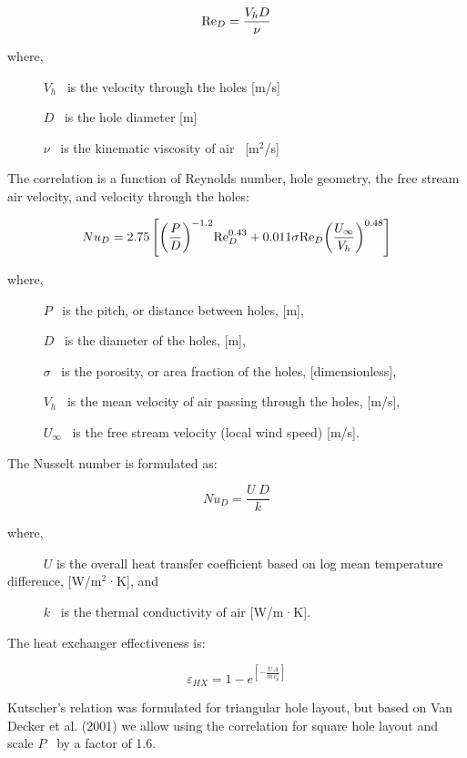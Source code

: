 \begin{equation}
{{\mathop{\rm Re}\nolimits}_D} = \frac{{{V_h}D}}{\nu }
\end{equation}

where,

~~~~~ \({V_h}\) ~is the velocity through the holes {[}m/s{]}

~~~~~ \(D\) ~is the hole diameter {[}m{]}

~~~~~ \(\nu\) ~is the kinematic viscosity of air~ {[}m\(^{2}\)/s{]}

The correlation is a function of Reynolds number, hole geometry, the free stream air velocity, and velocity through the holes:

\begin{equation}
N{u_D} = 2.75\left[ {{{\left( {\frac{P}{D}} \right)}^{ - 1.2}}{\mathop{\rm Re}\nolimits}_D^{0.43} + 0.011\sigma {{{\mathop{\rm Re}\nolimits} }_D}{{\left( {\frac{{{U_\infty }}}{{{V_h}}}} \right)}^{0.48}}} \right]
\end{equation}

where,

~~~~~ \(P\) ~is the pitch, or distance between holes, {[}m{]},

~~~~~ \(D\) ~is the diameter of the holes, {[}m{]},

~~~~~ \(\sigma\) ~is the porosity, or area fraction of the holes, {[}dimensionless{]},

~~~~~ \({V_h}\) ~is the mean velocity of air passing through the holes, {[}m/s{]},

~~~~~ \({U_\infty }\) ~is the free stream velocity (local wind speed) {[}m/s{]}.

The Nusselt number is formulated as:

\begin{equation}
N{u_D} = \frac{{U\;D}}{k}
\end{equation}

where,

~~~~~ \(U\) is the overall heat transfer coefficient based on log mean temperature difference, {[}W/m\(^{2}\)·K{]}, and

~~~~~ \(k\) ~is the thermal conductivity of air {[}W/m·K{]}.

The heat exchanger effectiveness is:

\begin{equation}
{\varepsilon_{HX}} = 1 - {e^{\left[ { - \frac{{U\,A}}{{\dot m\,{c_p}}}} \right]}}
\end{equation}

Kutscher's relation was formulated for triangular hole layout, but based on Van Decker et al. (2001) we allow using the correlation for square hole layout and scale \(P\) ~by a factor of 1.6.


